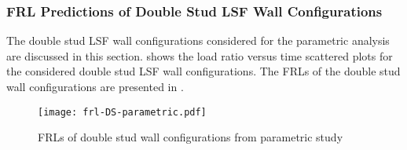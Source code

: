 \subsubsection{FRL Predictions of Double Stud LSF Wall Configurations}

The double stud LSF wall configurations considered for the parametric analysis are discussed in this section.  shows the load ratio versus time scattered plots for the considered double stud LSF wall configurations. The FRLs of the double stud wall configurations are presented in . 
\begin{figure}[!htbp]
	\centering
	\texttt{[image: frl-DS-parametric.pdf]}
	\caption{FRLs of double stud wall configurations from parametric study}
	\label{fig:frl-DS-parametric}
\end{figure}
